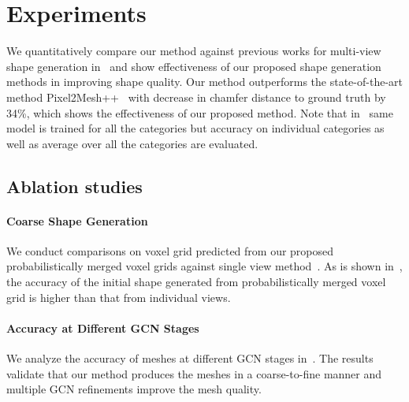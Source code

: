 \section*{Experiments}

We quantitatively compare our method against previous works for multi-view shape generation in~ and show effectiveness of our proposed shape generation methods in improving shape quality. Our method outperforms the state-of-the-art method  Pixel2Mesh++~\cite{wen2019pixel2mesh++} with
decrease in chamfer distance to ground truth by 34\%, which shows the effectiveness of our proposed method.
Note that in~ same model is trained for all the categories but accuracy on individual categories as well as average over all the categories are evaluated.



\subsection*{Ablation studies}

\vspace{-2mm}
\paragraph{Coarse Shape Generation}
We conduct comparisons on voxel grid predicted from our proposed probabilistically merged voxel grids against single view method~\cite{gkioxari2019meshrcnn}.
As is shown in~, the accuracy of the initial shape generated from probabilistically merged voxel grid is higher than that from individual views.


\vspace{-2mm}
\paragraph{Accuracy at Different GCN Stages}
We analyze the accuracy of meshes at different GCN stages in~. The results validate that our method produces the meshes in a coarse-to-fine manner and multiple GCN refinements improve the mesh quality.

